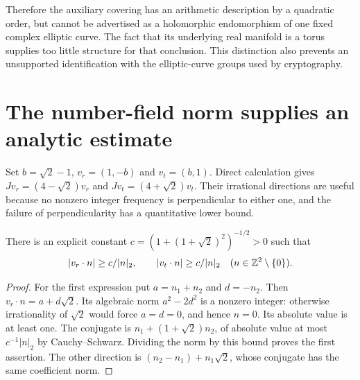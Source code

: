 Therefore the auxiliary covering has an arithmetic description by a quadratic order, but cannot be advertised as a holomorphic endomorphism of one fixed complex elliptic curve. The fact that its underlying real manifold is a torus supplies too little structure for that conclusion. This distinction also prevents an unsupported identification with the elliptic-curve groups used by cryptography.

\section{The number-field norm supplies an analytic estimate}

Set $b=\sqrt2-1$, $v_r=(1,-b)$ and $v_t=(b,1)$. Direct calculation gives
$Jv_r=(4-\sqrt2)v_r$ and $Jv_t=(4+\sqrt2)v_t$. Their irrational directions are useful because no nonzero integer frequency is perpendicular to either one, and the failure of perpendicularity has a quantitative lower bound.

\begin{lemma}
\label{lem:fluid-small-divisors}
There is an explicit constant $c=(1+(1+\sqrt2)^2)^{-1/2}>0$ such that
\[
 |v_r\cdot n|\ge c/|n|_2,\qquad |v_t\cdot n|\ge c/|n|_2
 \quad(n\in\mathbb{Z}^2\setminus\{0\}).
\]
\end{lemma}
\begin{proof}
For the first expression put $a=n_1+n_2$ and $d=-n_2$. Then $v_r\cdot n=a+d\sqrt2$. Its algebraic norm $a^2-2d^2$ is a nonzero integer: otherwise irrationality of $\sqrt2$ would force $a=d=0$, and hence $n=0$. Its absolute value is at least one. The conjugate is $n_1+(1+\sqrt2)n_2$, of absolute value at most $c^{-1}|n|_2$ by Cauchy--Schwarz. Dividing the norm by this bound proves the first assertion. The other direction is $(n_2-n_1)+n_1\sqrt2$, whose conjugate has the same coefficient norm.
\end{proof}

